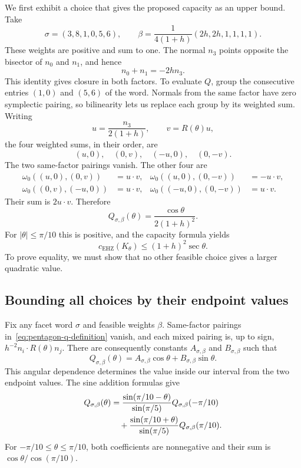 We first exhibit a choice that gives the proposed capacity as an upper
bound. Take
\[
 \sigma=(3,8,1,0,5,6),\qquad
 \beta=\frac1{4(1+h)}(2h,2h,1,1,1,1).
\]
These weights are positive and sum to one. The normal $n_3$ points
opposite the bisector of $n_0$ and $n_1$, and hence
\[
 n_0+n_1=-2h n_3.
\]
This identity gives closure in both factors. To evaluate $Q$, group the
consecutive entries $(1,0)$ and $(5,6)$ of the word. Normals from the
same factor have zero symplectic pairing, so bilinearity lets us replace
each group by its weighted sum. Writing
\[
 u=\frac{n_3}{2(1+h)},\qquad v=R(\theta)u,
\]
the four weighted sums, in their order, are
\[
 (u,0),\quad(0,v),\quad(-u,0),\quad(0,-v).
\]
The two same-factor pairings vanish. The other four are
\begin{align*}
 \omega_0((u,0),(0,v))&=u\cdot v,&
 \omega_0((u,0),(0,-v))&=-u\cdot v,\\
 \omega_0((0,v),(-u,0))&=u\cdot v,&
 \omega_0((-u,0),(0,-v))&=u\cdot v.
\end{align*}
Their sum is $2u\cdot v$. Therefore
\begin{equation}
 Q_{\sigma,\beta}(\theta)
 =\frac{\cos\theta}{2(1+h)^2}.
 \label{eq:pentagon-attaining-word}
\end{equation}
For $|\theta|\le\pi/10$ this is positive, and the capacity formula yields
\begin{equation}
 c_{\mathrm{EHZ}}(K_\theta)\le(1+h)^2\sec\theta.
 \label{eq:pentagon-upper-bound}
\end{equation}
To prove equality, we must show that no other feasible choice gives a
larger quadratic value.

\subsection{Bounding all choices by their endpoint values}

Fix any facet word $\sigma$ and feasible weights $\beta$.
Same-factor pairings in~\eqref{eq:pentagon-q-definition} vanish, and
each mixed pairing is, up to sign, $h^{-2}n_i\cdot R(\theta)n_j$.
There are consequently constants $A_{\sigma,\beta}$ and
$B_{\sigma,\beta}$ such that
\[
 Q_{\sigma,\beta}(\theta)=
 A_{\sigma,\beta}\cos\theta+B_{\sigma,\beta}\sin\theta.
\]
This angular dependence determines the value inside our interval from
the two endpoint values. The sine addition formulas give
\begin{align}
 Q_{\sigma,\beta}(\theta)
 &=\frac{\sin(\pi/10-\theta)}{\sin(\pi/5)}
       Q_{\sigma,\beta}(-\pi/10)\notag\\
 &\quad+\frac{\sin(\pi/10+\theta)}{\sin(\pi/5)}
       Q_{\sigma,\beta}(\pi/10).
 \label{eq:pentagon-interpolation}
\end{align}
For $-\pi/10\le\theta\le\pi/10$, both coefficients are nonnegative
and their sum is $\cos\theta/\cos(\pi/10)$.

